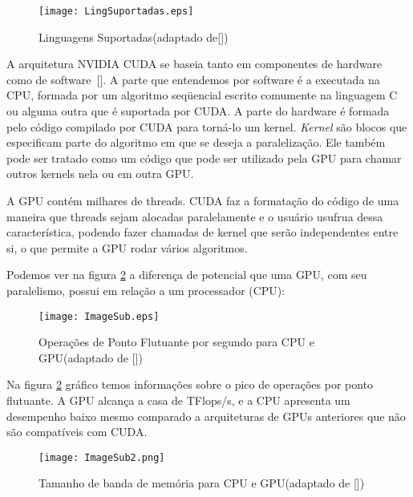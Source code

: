 \begin{figure}[htb]
	\begin{center}
	\centering
			\texttt{[image: LingSuportadas.eps]}
	\caption{Linguagens Suportadas(adaptado de[\cite{cuda}])}
	\label{fig:lingsuportadas}
	\end{center}
\end{figure}

A arquitetura NVIDIA CUDA se baseia tanto em componentes de hardware como de software~[\cite{cuda}]. A parte que entendemos por software é a executada na CPU, formada por um algoritmo seqüencial escrito comumente na linguagem C ou alguma outra que é suportada por CUDA. A parte do hardware é formada pelo código compilado por CUDA para torná-lo um kernel. \textit{Kernel} são blocos que especificam parte do algoritmo em que se deseja a
paralelização. Ele também pode ser tratado como um código que pode ser utilizado pela GPU para chamar outros kernels nela ou em outra GPU.

A GPU contém milhares de threads. CUDA faz a formatação do código de uma maneira que threads sejam alocadas paralelamente e o usuário usufrua dessa característica, podendo fazer chamadas de kernel que serão independentes entre si, o que permite a GPU rodar vários algoritmos.

Podemos ver na figura \ref{fig:graficoscuda1} a diferença de potencial que uma GPU, com seu paralelismo, possui em relação a um processador (CPU):

\begin{figure}[!htb]
	\begin{center}
	\centering
			\texttt{[image: ImageSub.eps]}
	\caption{Operações de Ponto Flutuante por segundo para CPU e GPU(adaptado de [\cite{cuda}])}
	\label{fig:graficoscuda1}
	\end{center}
\end{figure}

Na figura \ref{fig:graficoscuda1} gráfico temos informações sobre o pico de operações por ponto flutuante. A GPU alcança a casa de TFlops/s, e a CPU apresenta um desempenho baixo mesmo comparado a arquiteturas de GPUs anteriores que não são compatíveis com CUDA.

\begin{figure}[!htb]
	\begin{center}
	\centering
			\texttt{[image: ImageSub2.png]}
	\caption{Tamanho de banda de memória para CPU e GPU(adaptado de [\cite{cuda}])}
	\label{fig:graficoscuda2}
	\end{center}
\end{figure}


